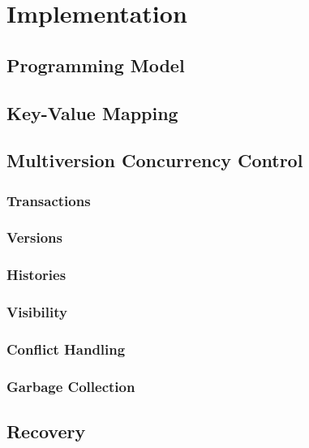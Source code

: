 \chapter{Implementation}
\label{ch:impl}

\section{Programming Model}
\section{Key-Value Mapping}
\section{Multiversion Concurrency Control}
\subsection{Transactions}
\subsection{Versions}
\subsection{Histories}
\subsection{Visibility}
\subsection{Conflict Handling}
\subsection{Garbage Collection}
\section{Recovery}

